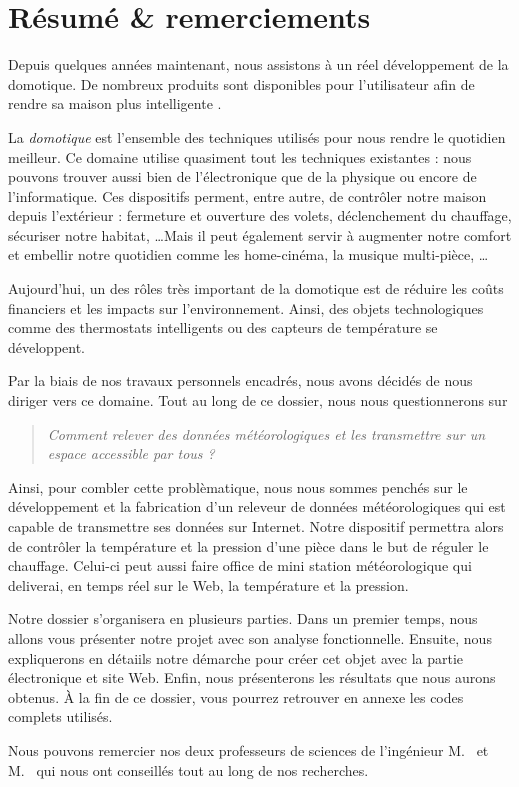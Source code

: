 \chapter*{Résumé \&{} remerciements}

Depuis quelques années maintenant, nous assistons à un réel développement de la domotique. De nombreux produits sont disponibles pour l'utilisateur afin de rendre sa maison plus \og intelligente \fg.

La \emph{domotique} est l'ensemble des techniques utilisés pour nous rendre le quotidien meilleur. Ce domaine utilise quasiment tout les techniques existantes : nous pouvons trouver aussi bien de l'électronique que de la physique ou encore de l'informatique. Ces dispositifs perment, entre autre, de contrôler notre maison depuis l'extérieur : fermeture et ouverture des volets, déclenchement du chauffage, sécuriser notre habitat, \dots Mais il peut également servir à augmenter notre comfort et embellir notre quotidien comme les home-cinéma, la musique multi-pièce, \dots

Aujourd'hui, un des rôles très important de la domotique est de réduire les coûts financiers et les impacts sur l'environnement. Ainsi, des objets technologiques comme des thermostats intelligents ou des capteurs de température se développent.

\Espace

Par la biais de nos travaux personnels encadrés, nous avons décidés de nous diriger vers ce domaine. Tout au long de ce dossier, nous nous questionnerons sur
\begin{quotation}
	\noindent\itshape Comment relever des données météorologiques et les transmettre sur un espace accessible par tous ?
\end{quotation}
Ainsi, pour combler cette problèmatique, nous nous sommes penchés sur le développement et la fabrication d'un releveur de données météorologiques qui est capable de transmettre ses données sur Internet. Notre dispositif permettra alors de contrôler la température et la pression d'une pièce dans le but de réguler le chauffage. Celui-ci peut aussi faire office de mini station météorologique qui deliverai, en temps réel sur le Web, la température et la pression.

Notre dossier s'organisera en plusieurs parties. Dans un premier temps, nous allons vous présenter notre projet avec son analyse fonctionnelle. Ensuite, nous expliquerons en détaiils notre démarche pour créer cet objet avec la partie électronique et site Web. Enfin, nous présenterons les résultats que nous aurons obtenus. À la fin de ce dossier, vous pourrez retrouver en annexe les codes complets utilisés.

\Espace

Nous pouvons remercier nos deux professeurs de sciences de l'ingénieur M.~ et M.~ qui nous ont conseillés tout au long de nos recherches.